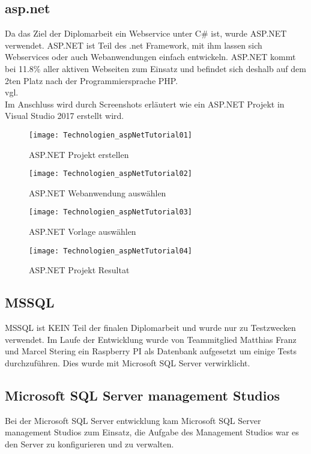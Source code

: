 \subsection {asp.net}
\label{sec:asp.net}
Da das Ziel der Diplomarbeit ein Webservice unter C\# ist, wurde ASP.NET verwendet. ASP.NET ist Teil des .net Framework, mit ihm lassen sich Webservices oder auch Webanwendungen einfach entwickeln. ASP.NET kommt bei 11.8\% aller aktiven Webseiten zum Einsatz und befindet sich deshalb auf dem 2ten Platz nach der Programmiersprache PHP. \\vgl. \cite{aspnetstatistik}
\\ Im Anschluss wird durch Screenshots erläutert wie ein ASP.NET Projekt in Visual Studio 2017 erstellt wird.
\begin{figure}[h]
    \texttt{[image: Technologien\_aspNetTutorial01]}
    \caption{ASP.NET Projekt erstellen}
    \label{fig:aspNetTut01}
\end{figure}
\begin{figure}[h]
    \texttt{[image: Technologien\_aspNetTutorial02]}
    \caption{ASP.NET Webanwendung auswählen}
    \label{fig:aspNetTut02}
\end{figure}
\begin{figure}[H]
    \texttt{[image: Technologien\_aspNetTutorial03]}
    \caption{ASP.NET Vorlage auswählen}
    \label{fig:aspNetTut03}
\end{figure}
\begin{figure}[h]
    \texttt{[image: Technologien\_aspNetTutorial04]}
    \caption{ASP.NET Projekt Resultat}
    \label{fig:aspNetTut04}
\end{figure}
\subsection {MSSQL}
\label{sec:MSSQL}
MSSQL ist KEIN Teil der finalen Diplomarbeit und wurde nur zu Testzwecken verwendet. Im Laufe der Entwicklung wurde von Teammitglied Matthias Franz und Marcel Stering ein Raspberry PI als Datenbank aufgesetzt um einige Tests durchzuführen. Dies wurde mit Microsoft SQL Server verwirklicht. 
\subsection {Microsoft SQL Server management Studios}
\label{sec:mssql-server-management-studio}
Bei der Microsoft SQL Server entwicklung kam Microsoft SQL Server management Studios zum Einsatz, die Aufgabe des Management Studios war es den Server zu konfigurieren und zu verwalten. 
